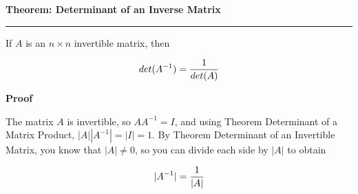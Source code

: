 \nopagenumbers
{\bf Theorem: Determinant of an Inverse Matrix}
\vskip 1mm
\hrule

\vskip 6pt
If $A$ is an $n\times n$ invertible matrix, then

$$det(A^{-1})={1\over det(A)}$$

\vskip 10pt
{\bf Proof}

\vskip 6pt
The matrix $A$ is invertible, so $AA^{-1}=I$, and using Theorem Determinant of a Matrix Product, $|A||A^{-1}|=|I|=1$. By Theorem Determinant of an Invertible Matrix, you know that $|A|\neq 0$, so you can divide each side by $|A|$ to obtain

$$|A^{-1}|={1\over |A|}$$

\vfill\eject
\bye
